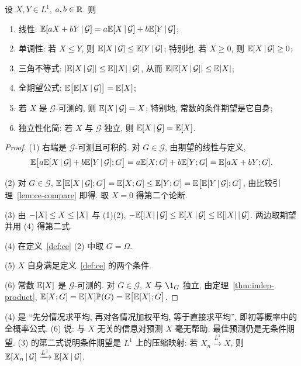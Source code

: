 \begin{theorem}[条件期望的基本性质]\label{thm:ce-basic}
设 $X,Y\in L^1$, $a,b\in\mathbb{R}$. 则
\begin{enumerate}
\item 线性: $\mathbb{E}[aX+bY\,|\,\mathcal{G}]=a\mathbb{E}[X\,|\,\mathcal{G}]+b\mathbb{E}[Y\,|\,\mathcal{G}]$;
\item 单调性: 若 $X\le Y$, 则 $\mathbb{E}[X\,|\,\mathcal{G}]\le\mathbb{E}[Y\,|\,\mathcal{G}]$; 特别地, 若 $X\ge0$, 则 $\mathbb{E}[X\,|\,\mathcal{G}]\ge0$;
\item 三角不等式: $\lvert\mathbb{E}[X\,|\,\mathcal{G}]\rvert\le\mathbb{E}[\lvert X\rvert\,|\,\mathcal{G}]$, 从而 $\mathbb{E}\lvert\mathbb{E}[X\,|\,\mathcal{G}]\rvert\le\mathbb{E}\lvert X\rvert$;
\item 全期望公式: $\mathbb{E}\big[\mathbb{E}[X\,|\,\mathcal{G}]\big]=\mathbb{E}[X]$;
\item 若 $X$ 是 $\mathcal{G}$-可测的, 则 $\mathbb{E}[X\,|\,\mathcal{G}]=X$; 特别地, 常数的条件期望是它自身;
\item 独立性化简: 若 $X$ 与 $\mathcal{G}$ 独立, 则 $\mathbb{E}[X\,|\,\mathcal{G}]=\mathbb{E}[X]$.
\end{enumerate}
\end{theorem}

\begin{proof}
(1) 右端是 $\mathcal{G}$-可测且可积的. 对 $G\in\mathcal{G}$, 由期望的线性与定义,
\[
\mathbb{E}\big[a\mathbb{E}[X\,|\,\mathcal{G}]+b\mathbb{E}[Y\,|\,\mathcal{G}];G\big]=a\mathbb{E}[X;G]+b\mathbb{E}[Y;G]=\mathbb{E}[aX+bY;G].
\]

(2) 对 $G\in\mathcal{G}$, $\mathbb{E}\big[\mathbb{E}[X\,|\,\mathcal{G}];G\big]=\mathbb{E}[X;G]\le\mathbb{E}[Y;G]=\mathbb{E}\big[\mathbb{E}[Y\,|\,\mathcal{G}];G\big]$, 由比较引理~\ref{lem:ce-compare} 即得. 取 $X=0$ 得第二个论断.

(3) 由 $-\lvert X\rvert\le X\le\lvert X\rvert$ 与 (1)(2), $-\mathbb{E}[\lvert X\rvert\,|\,\mathcal{G}]\le\mathbb{E}[X\,|\,\mathcal{G}]\le\mathbb{E}[\lvert X\rvert\,|\,\mathcal{G}]$. 两边取期望并用 (4) 得第二式.

(4) 在定义~\ref{def:ce} (2) 中取 $G=\Omega$.

(5) $X$ 自身满足定义~\ref{def:ce} 的两个条件.

(6) 常数 $\mathbb{E}[X]$ 是 $\mathcal{G}$-可测的. 对 $G\in\mathcal{G}$, $X$ 与 $\1_G$ 独立, 由定理~\ref{thm:indep-product}, $\mathbb{E}[X;G]=\mathbb{E}[X]\mathbb{P}(G)=\mathbb{E}\big[\mathbb{E}[X];G\big]$.
\end{proof}

\begin{intuition}
(4) 是 ``先分情况求平均, 再对各情况加权平均, 等于直接求平均'', 即初等概率中的全概率公式. (6) 说: 与 $X$ 无关的信息对预测 $X$ 毫无帮助, 最佳预测仍是无条件期望. (3) 的第二式说明条件期望是 $L^1$ 上的压缩映射: 若 $X_n\xrightarrow{L^1}X$, 则 $\mathbb{E}[X_n\,|\,\mathcal{G}]\xrightarrow{L^1}\mathbb{E}[X\,|\,\mathcal{G}]$.
\end{intuition}

